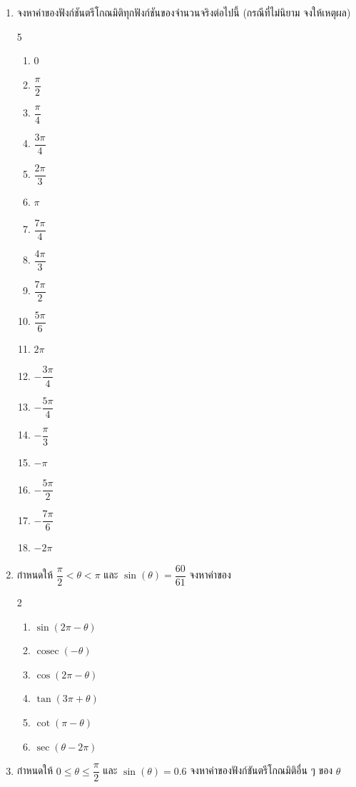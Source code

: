\begin{enumerate}[label=\arabic*., leftmargin=*]
	\item จงหาค่าของฟังก์ชันตรีโกณมิติทุกฟังก์ชันของจำนวนจริงต่อไปนี้ (กรณีที่ไม่นิยาม จงให้เหตุผล)
	\begin{multicols}{5}
		\begin{enumerate}[label=\theenumi\arabic*), leftmargin=1.5em, itemsep=0.6em]
			\everymath{\displaystyle}
			\item $0$
			\item $\dfrac{\pi}{2}$
			\item $\dfrac{\pi}{4}$
			\item $\dfrac{3\pi}{4}$
			\item $\dfrac{2\pi}{3}$
			\item $\pi$
			\item $\dfrac{7\pi}{4}$
			\item $\dfrac{4\pi}{3}$
			\item $\dfrac{7\pi}{2}$
			\item $\dfrac{5\pi}{6}$
			\item $2\pi$
			\item $-\dfrac{3\pi}{4}$
			\item $-\dfrac{5\pi}{4}$
			\item $-\dfrac{\pi}{3}$
			\item $-\pi$
			\item $-\dfrac{5\pi}{2}$
			\item $-\dfrac{7\pi}{6}$
			\item $-2\pi$
		\end{enumerate}
	\end{multicols}
	\item กำหนดให้ $\dfrac{\pi}{2} < \theta < \pi$ และ $\sin \left( \theta \right) = \dfrac{60}{61}$ จงหาค่าของ
	\begin{multicols}{2}
	\begin{enumerate}[label=\theenumi\arabic*), leftmargin=1.5em, itemsep=0.6em]
		\everymath{\displaystyle}
		\item $\sin \left( 2\pi - \theta \right)$
		\item $\operatorname{cosec} \left( -\theta \right)$
		\item $\cos \left( 2\pi - \theta \right)$
		\item $\tan \left( 3\pi + \theta \right)$
		\item $\cot \left( \pi - \theta \right)$
		\item $\sec \left( \theta - 2\pi \right)$
	\end{enumerate}
	\end{multicols}
	\item กำหนดให้ $0 \leq \theta \leq \dfrac{\pi}{2}$ และ $\sin \left( \theta \right) = 0.6$ จงหาค่าของฟังก์ชันตรีโกณมิติอื่น ๆ ของ $\theta$
	

\end{enumerate}
